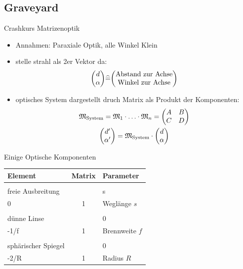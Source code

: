 \documentclass[10pt, aspectratio=169]{beamer}
\begin{document}
\subsection*{Graveyard}
\begin{frame}{Crashkurs Matrizenoptik}
  \begin{itemize}
  \item<1-> Annahmen: Paraxiale Optik, alle Winkel Klein
  \item<2-> stelle strahl als 2er Vektor da:
    \begin{equation}
      \mqty(d \\ \alpha) \widehat{=} \mqty(\text{Abstand zur Achse} \\
      \text{Winkel zur Achse})
    \end{equation}

  \item<3-> optisches System dargestellt druch Matrix als Produkt der
    Komponenten:
    \begin{gather}
      \label{eq:systmatrix}
      \mathfrak{M}_{\text{System}}=\mathfrak{M}_{\text{1}}\cdot\ldots\cdot\mathfrak{M}_{n}=\mqty(A
      & B \\ C & D) \\
      \mqty(d' \\ \alpha') = \mathfrak{M}_{\text{System}}\cdot\mqty(d
      \\ \alpha)
    \end{gather}
  \end{itemize}
\end{frame}
\begin{frame}{Einige Optische Komponenten}
  \begin{table}[h!]
    \begin{tabular}{l | c | l}
      \textbf{Element} & \textbf{Matrix} & \textbf{Parameter} \\
      \midrule\\
      \addlinespace[-2ex]
      freie Ausbreitung & \(\begin{pmatrix}
        1 & s \\
        0 & 1
      \end{pmatrix}\) & Wegl\"ange \(s\) \\
      \midrule\\
      \addlinespace[-2ex] d\"unne Linse & \(\begin{pmatrix}
        1 & 0 \\
        -1/f & 1
      \end{pmatrix}\) & Brennweite \(f\) \\
      \midrule\\
      \addlinespace[-2ex] sph\"arischer Spiegel & \(\begin{pmatrix}
        1 & 0 \\
        -2/R & 1
      \end{pmatrix}\) & Radius \(R\) \\

    \end{tabular}
  \end{table}
\end{frame}
\end{document}
